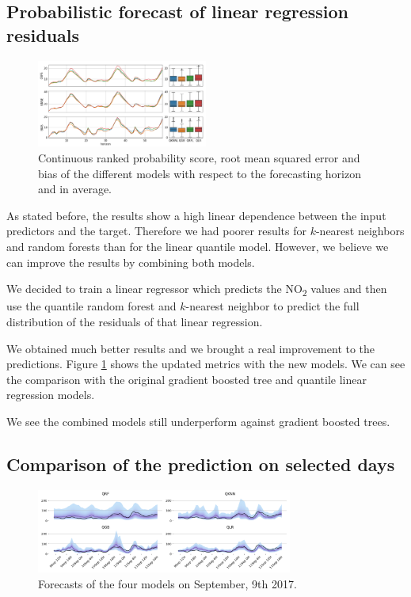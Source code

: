 \documentclass[a4paper,twocolumn,5p]{elsarticle}
\begin{document}
\subsection{Probabilistic forecast of linear regression residuals}

\begin{figure}[tbp]
  \centering
  \includegraphics[width=0.5\textwidth]{errorGraph_rfl_knnl}
  \caption{Continuous ranked probability score, root mean squared
    error and bias of the different models with respect to the
    forecasting horizon and in average.}
  \label{figure:errorGraph_rfl}
\end{figure}

As stated before, the results show a high linear dependence between
the input predictors and the target. Therefore we had poorer results
for $k$-nearest neighbors and random forests than for the linear
quantile model. However, we believe we can improve the results by
combining both models.

We decided to train a linear regressor which predicts the
NO\textsubscript{2} values and then use the quantile random forest and
$k$-nearest neighbor to predict the full distribution of the residuals
of that linear regression.

We obtained much better results and we brought a real improvement to
the predictions. Figure \ref{figure:errorGraph_rfl} shows the updated
metrics with the new models.  We can see the comparison with the
original gradient boosted tree and quantile linear regression models.

We see the combined models still underperform against gradient boosted
trees.



\subsection{Comparison of the prediction on selected days}

\begin{figure}
  \centering
  \includegraphics[width=0.75\textwidth]{evoday1}
  \caption{Forecasts of the four models on September, 9th
    2017.}
  \label{figure:evoday1} 
\end{figure}
\end{document}
